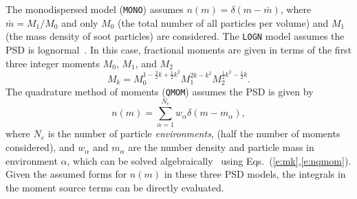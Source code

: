 \documentclass[preprint,letterpaper]{elsarticle}
\begin{document}
The monodispersed model (\texttt{MONO}) assumes $n(m)=\delta(m-\bar{m})$, where $\bar{m}=M_1/M_0$ and only $M_0$ (the total number of all particles per volume) and $M_1$ (the mass density of soot particles) are considered. The \texttt{LOGN} model assumes the PSD is lognormal~\cite{Pratsinis_1988}. In this case, fractional moments are given in terms of the first three integer moments $M_0$, $M_1$, and $M_2$~\cite{Lignell_2008b}
%
\begin{equation}
    M_k = M_0^{1-\frac{3}{2}k+\frac{1}{2}k^2} M_1^{2k-k^2} M_2^{\frac{1}{2}k^2-\frac{1}{2}k}.
\end{equation}
%
The quadrature method of moments (\texttt{QMOM}) assumes the PSD is given by
%
\begin{equation} \label{e:nqmom}
    n(m) = \sum_{\alpha=1}^{N_e}w_\alpha\delta(m-m_\alpha),
\end{equation}
%
where $N_e$ is the number of particle \emph{environments}, (half the number of moments considered), and $w_\alpha$ and $m_\alpha$ are the number density and particle mass in environment $\alpha$, which can be solved algebraically~\cite{Wheeler_1974, Marchisio_2013} using Eqs.~(\ref{e:mk},\ref{e:nqmom}). Given the assumed forms for $n(m)$ in these three PSD models, the integrals in the moment source terms can be directly evaluated.



\end{document}
